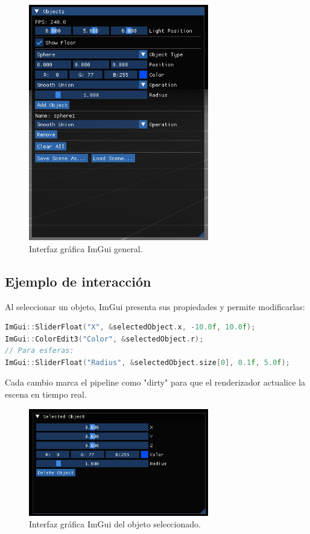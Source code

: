 \begin{figure}[H]
	\centering
	\includegraphics[width=0.7\textwidth]{imagenes/ImGui.png}
	\caption{Interfaz gráfica ImGui general.}
\end{figure}


\subsection{Ejemplo de interacción}

Al seleccionar un objeto, ImGui presenta sus propiedades y permite
modificarlas:
\begin{lstlisting}[language=C++,caption={Edición de propiedades de un objeto SDF seleccionado}]
ImGui::SliderFloat("X", &selectedObject.x, -10.0f, 10.0f);
ImGui::ColorEdit3("Color", &selectedObject.r);
// Para esferas:
ImGui::SliderFloat("Radius", &selectedObject.size[0], 0.1f, 5.0f);
\end{lstlisting}
Cada cambio marca el pipeline como "dirty" para que el renderizador actualice
la escena en tiempo real.

\begin{figure}[H]
	\centering
	\includegraphics[width=0.7\textwidth]{imagenes/ImGui_selected.png}
	\caption{Interfaz gráfica ImGui del objeto seleccionado.}
\end{figure}


